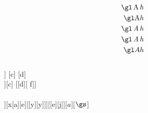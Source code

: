\documentclass[10pt]{article}
\begin{document}
\begin{align*}
\gl\operatorname{A}h\\
\gl\mathrm{A}h\\
\gl\operatorname{\mathit{A}}h\\
\gl\opA h\\
\gl Ah
\end{align*}
\foo[a][b][c]\\
\foo[[a][b]] [c] [d]\\
\foo[[a][b]][c] [[d][ f]]\\
\baz[1][2][3][4][5]\\
\baz[[a][]][x[a][e][[y][y]]][[e][j]][$a$][$\gs$]
\end{document}
